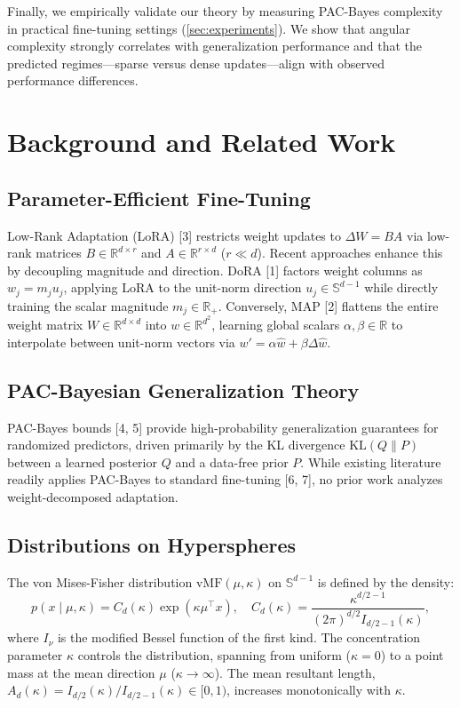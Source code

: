 \documentclass[11pt]{article}
\begin{document}
Finally, we empirically validate our theory by measuring PAC-Bayes
complexity in practical fine-tuning settings (\cref{sec:experiments}).
We show that angular complexity strongly correlates with generalization
performance and that the predicted regimes---sparse versus dense
updates---align with observed performance differences.



\section{Background and Related Work}

\subsection{Parameter-Efficient Fine-Tuning}
Low-Rank Adaptation (LoRA) [3] restricts weight updates to $\Delta W = BA$ via low-rank matrices $B \in \mathbb{R}^{d \times r}$ and $A \in \mathbb{R}^{r \times d}$ ($r \ll d$). Recent approaches enhance this by decoupling magnitude and direction. DoRA [1] factors weight columns as $w_j = m_j u_j$, applying LoRA to the unit-norm direction $u_j \in \mathbb{S}^{d-1}$ while directly training the scalar magnitude $m_j \in \mathbb{R}_+$. Conversely, MAP [2] flattens the entire weight matrix $W \in \mathbb{R}^{d \times d}$ into $w \in \mathbb{R}^{d^2}$, learning global scalars $\alpha, \beta \in \mathbb{R}$ to interpolate between unit-norm vectors via $w' = \alpha \hat{w} + \beta \Delta \hat{w}$.

\subsection{PAC-Bayesian Generalization Theory}
PAC-Bayes bounds [4, 5] provide high-probability generalization guarantees for randomized predictors, driven primarily by the KL divergence $\text{KL}(Q\|P)$ between a learned posterior $Q$ and a data-free prior $P$. While existing literature readily applies PAC-Bayes to standard fine-tuning [6, 7], no prior work analyzes weight-decomposed adaptation.

\subsection{Distributions on Hyperspheres}
The von Mises-Fisher distribution $\text{vMF}(\mu, \kappa)$ on $\mathbb{S}^{d-1}$ is defined by the density:
\[
p(x \mid \mu, \kappa) = C_d(\kappa) \exp(\kappa \mu^\top x), \quad C_d(\kappa) = \frac{\kappa^{d/2-1}}{(2\pi)^{d/2} I_{d/2-1}(\kappa)},
\]
where $I_\nu$ is the modified Bessel function of the first kind. The concentration parameter $\kappa$ controls the distribution, spanning from uniform ($\kappa = 0$) to a point mass at the mean direction $\mu$ ($\kappa \to \infty$). The mean resultant length, $A_d(\kappa) = I_{d/2}(\kappa) / I_{d/2-1}(\kappa) \in [0, 1)$, increases monotonically with $\kappa$.
\end{document}
